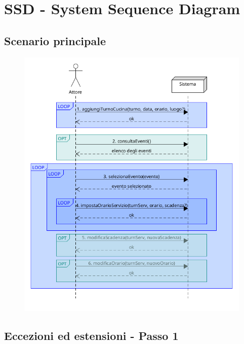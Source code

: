 \chapter{SSD - System Sequence Diagram}

\section{Scenario principale}

\begin{figure}[h]
    \begin{center}
      \includegraphics[scale = 0.45]{images/SSD/SSD - Scenario Principale.png}
    \end{center}
\end{figure}

\section{Eccezioni ed estensioni - Passo 1}


